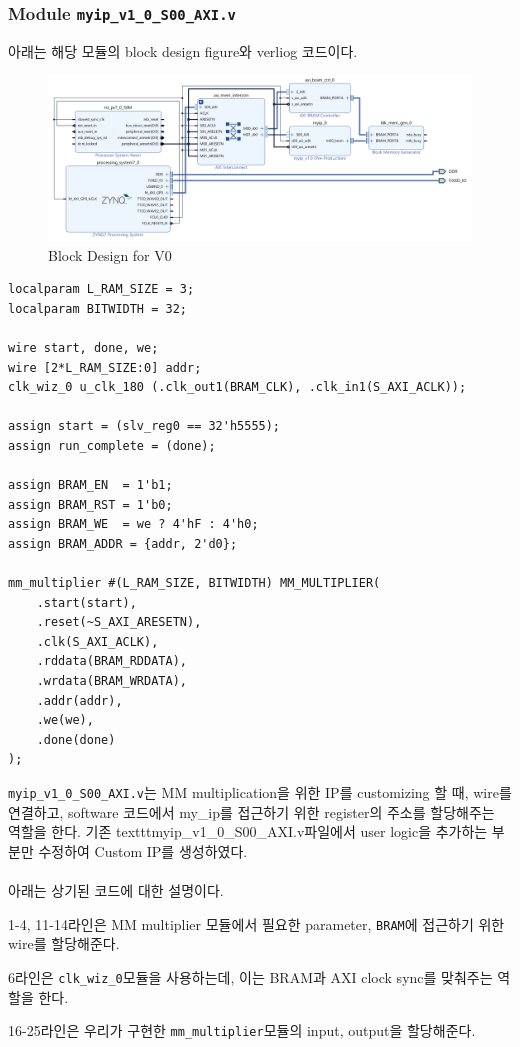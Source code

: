 \documentclass{article}
\begin{document}
\subsubsection*{Module \texttt{myip\_v1\_0\_S00\_AXI.v}}
\label{sec:s00}
아래는 해당 모듈의 block design figure와 verliog 코드이다.
\begin{figure}[ht]
	\centering
	\includegraphics[width=1.0\textwidth]{fig/V0/design.png}
\caption{Block Design for V0}
\label{design_v0}
\end{figure}

\begin{lstlisting}[style={verilog-style}]
localparam L_RAM_SIZE = 3;
localparam BITWIDTH = 32;

wire start, done, we;
wire [2*L_RAM_SIZE:0] addr;
clk_wiz_0 u_clk_180 (.clk_out1(BRAM_CLK), .clk_in1(S_AXI_ACLK));

assign start = (slv_reg0 == 32'h5555);
assign run_complete = (done);

assign BRAM_EN  = 1'b1;
assign BRAM_RST = 1'b0;
assign BRAM_WE  = we ? 4'hF : 4'h0;
assign BRAM_ADDR = {addr, 2'd0};

mm_multiplier #(L_RAM_SIZE, BITWIDTH) MM_MULTIPLIER(
    .start(start),
    .reset(~S_AXI_ARESETN),
    .clk(S_AXI_ACLK),
    .rddata(BRAM_RDDATA),
    .wrdata(BRAM_WRDATA),
    .addr(addr),
    .we(we),
    .done(done)
);
\end{lstlisting}
\texttt{myip\_v1\_0\_S00\_AXI.v}는 MM multiplication을 위한 IP를 customizing 할 때, wire를 연결하고, software 코드에서 my\_ip를 접근하기 위한 register의 주소를 할당해주는 역할을 한다. 기존 texttt{myip\_v1\_0\_S00\_AXI.v}파일에서 user logic을 추가하는 부분만 수정하여 Custom IP를 생성하였다.\\\\
아래는 상기된 코드에 대한 설명이다.
\begin{itemize*}
    \item 1-4, 11-14라인은 MM multiplier 모듈에서 필요한 parameter, \texttt{BRAM}에 접근하기 위한 wire를 할당해준다.
    \item 6라인은 \texttt{clk\_wiz\_0}모듈을 사용하는데, 이는 BRAM과 AXI clock sync를 맞춰주는 역할을 한다.
    \item 16-25라인은 우리가 구현한 \texttt{mm\_multiplier}모듈의 input, output을 할당해준다.
\end{itemize*}
\end{document}
